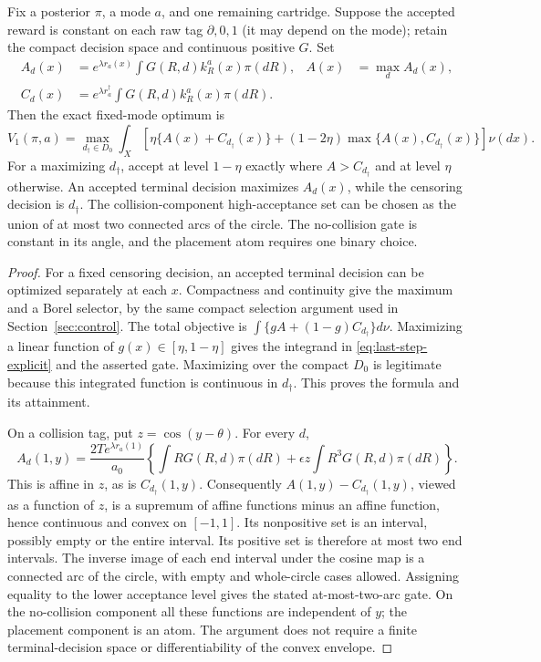 \begin{theorem}\label{thm:two-arcs}
Fix a posterior $\pi$, a mode $a$, and one remaining cartridge. Suppose the
accepted reward is constant on each raw tag $\partial,0,1$ (it may depend on
the mode); retain the compact decision space and continuous positive $G$.
Set
\[
 \begin{aligned}
 A_d(x)&=e^{\lambda r_a(x)}\int G(R,d)k_R^a(x)\pi(dR),
 &A(x)&=\max_d A_d(x),\\
 C_d(x)&=e^{\lambda r_a^\dagger}\int G(R,d)k_R^a(x)\pi(dR).
 \end{aligned}
\]
Then the exact fixed-mode optimum is
\begin{equation}
 V_1(\pi,a)=\max_{d_\dagger\in D_0}\int_X
 \left[\eta\{A(x)+C_{d_\dagger}(x)\}
 +(1-2\eta)\max\{A(x),C_{d_\dagger}(x)\}\right]\nu(dx).
 \label{eq:last-step-explicit}
\end{equation}
For a maximizing $d_\dagger$, accept at level $1-\eta$ exactly where
$A>C_{d_\dagger}$ and at level $\eta$ otherwise. An accepted terminal
decision maximizes $A_d(x)$, while the censoring decision is $d_\dagger$.
The collision-component high-acceptance set can be chosen as the union of
at most two connected arcs of the circle. The no-collision gate is constant
in its angle, and the placement atom requires one binary choice.
\end{theorem}
\begin{proof}
For a fixed censoring decision, an accepted terminal decision can be
optimized separately at each $x$. Compactness and continuity give the
maximum and a Borel selector, by the same compact selection argument used
in Section~\ref{sec:control}. The total objective is
$\int\{gA+(1-g)C_{d_\dagger}\}d\nu$. Maximizing a linear function of
$g(x)\in[\eta,1-\eta]$ gives the integrand in
\eqref{eq:last-step-explicit} and the asserted gate. Maximizing over the
compact $D_0$ is legitimate because this integrated function is continuous
in $d_\dagger$. This proves the formula and its attainment.

On a collision tag, put $z=\cos(y-\theta)$. For every $d$,
\[
 A_d(1,y)=\frac{2T e^{\lambda r_a(1)}}{a_0}
       \left\{\int R G(R,d)\pi(dR)
                  +\epsilon z\int R^3G(R,d)\pi(dR)\right\}.
\]
This is affine in $z$, as is $C_{d_\dagger}(1,y)$. Consequently
$A(1,y)-C_{d_\dagger}(1,y)$, viewed as a function of $z$, is a supremum of
affine functions minus an affine function, hence continuous and convex on
$[-1,1]$. Its nonpositive set is an interval, possibly empty or the entire
interval. Its positive set is therefore at most two end intervals. The
inverse image of each end interval under the cosine map is a connected arc
of the circle, with empty and whole-circle cases allowed. Assigning equality
to the lower acceptance level gives the stated at-most-two-arc gate. On the
no-collision component all these functions are independent of $y$; the
placement component is an atom. The argument does not require a finite
terminal-decision space or differentiability of the convex envelope.
\end{proof}


